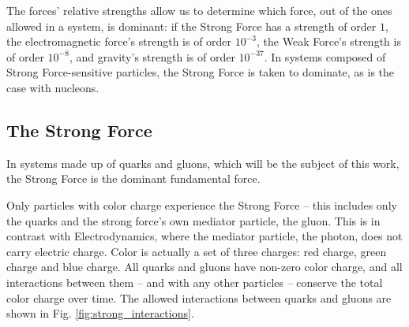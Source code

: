 
The forces' relative strengths allow us to determine which force, out of the ones allowed in a system, is dominant: if the Strong Force has a strength of order $1$, the electromagnetic force's strength is of order $10^{-3}$, the Weak Force's strength is of order $10^{-8}$, and gravity's strength is of order $10^{-37}$. \cite{Thomson:2013} In systems composed of Strong Force-sensitive particles, the Strong Force is taken to dominate, as is the case with nucleons. 



	\subsection{The Strong Force}
In systems made up of quarks and gluons, which will be the subject of this work, the Strong Force is the dominant fundamental 
force. %

Only particles with color charge experience the Strong Force -- this includes only the quarks and the strong force's own mediator particle, the gluon. This is in contrast with Electrodynamics, where the mediator particle, the photon, does not carry electric charge.
Color is actually a set of three charges: red charge, green charge and blue charge. All quarks and gluons have non-zero color charge, and all interactions between them -- and with any other particles -- conserve the total color charge over time. The allowed interactions between quarks and gluons are shown in Fig. \ref{fig:strong_interactions}.

